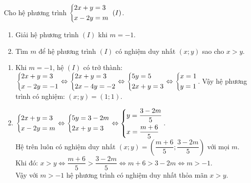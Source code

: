 \begin{bt}%
	Cho hệ phương trình $\left\{\begin{aligned}&2x+y=3\\&x-2y=m\end{aligned}\right.\ (I)$.
	\begin{enumerate}
		\item Giải hệ phương trình $(I)$ khi $m=-1$.
		\item Tìm $m$ để hệ phương trình $(I)$ có nghiệm duy nhất $\left(x;y\right)$ sao cho $x>y$.      
	\end{enumerate}
	\loigiai
	{
		\begin{enumerate}
			\item Khi $m=-1$, hệ $(I)$ có trở thành:\\
			$\left\{\begin{aligned}&2x+y=3\\&x-2y=-1\end{aligned}\right.\Leftrightarrow \left\{\begin{aligned}&2x+y=3\\&2x-4y=-2\end{aligned}\right.\Leftrightarrow\left\{\begin{aligned}&5y=5\\&2x+y=3\end{aligned}\right.\Leftrightarrow\left\{\begin{aligned}&x=1\\&y=1\end{aligned}\right.$.
			Vậy hệ phương trình có nghiệm: $(x;y)=(1;1)$.
			\item $\left\{\begin{aligned}&2x+y=3\\&x-2y=m\end{aligned}\right.\Leftrightarrow \left\{\begin{aligned}&5y=3-2m\\&2x+y=3\end{aligned}\right.\Leftrightarrow \left\{\begin{aligned}&y=\dfrac{3-2m}{5}\\&x=\dfrac{m+6}{5}\end{aligned}\right.$.\\
			Hệ trên luôn có nghiệm duy nhất $(x;y)=\left(\dfrac{m+6}{5};\dfrac{3-2m}{5}\right)$ với mọi $m$.\\
			Khi đó: $x>y\Leftrightarrow \dfrac{m+6}{5}>\dfrac{3-2m}{5}\Leftrightarrow m+6>3-2m\Leftrightarrow m>-1$.\\
			Vậy với $m>-1$ hệ phương trình có nghiệm duy nhất thỏa mãn $x>y$.
		\end{enumerate}
	}
\end{bt}

